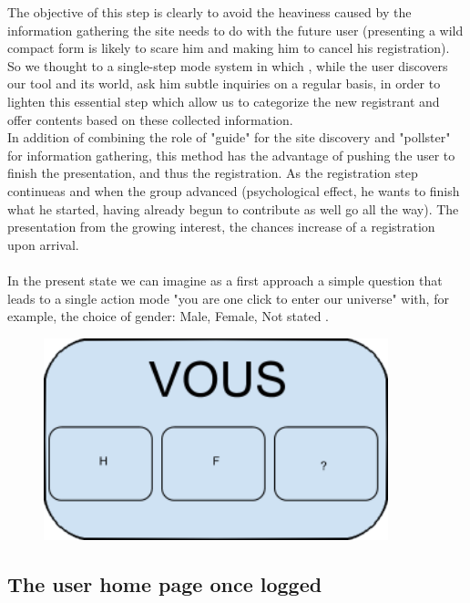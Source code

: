 \documentclass {life-en}
\begin{document}
The objective of this step is clearly to avoid the heaviness caused by the information gathering the site needs to do with the future user (presenting a wild compact form is likely to scare him and making him to cancel his registration).\\

So we thought to a single-step mode system in which , while the user discovers our tool and its world, ask him subtle inquiries on a regular basis, in order to lighten this essential step which allow us to categorize the new registrant and offer contents based on these collected information.\\

In addition of combining the role of "guide" for the site discovery and "pollster" for information gathering, this method has the advantage of pushing the user to finish the presentation, and thus the registration. As the registration step continueas and when the group advanced (psychological effect, he wants to finish what he started, having already begun to contribute as well go all the way). The presentation from the growing interest, the chances increase of a registration upon arrival.\\
\\

In the present state we can imagine as a first approach a simple question that leads to a single action mode "you are one click to enter our universe" with, for example, the choice of gender: Male, Female, Not stated .

\begin{figure} [H]
  \begin{center}
    \includegraphics [width = 10cm]{img/vous.png}
  \end{center}
\end{figure}

\newpage

\subsection{The user home page once logged}
\end{document}

